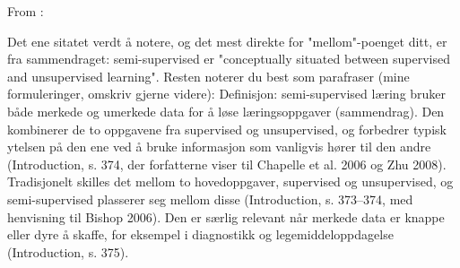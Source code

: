From \parencite{engelen2020semi_supervised} :

Det ene sitatet verdt å notere, og det mest direkte for "mellom"-poenget ditt, er fra sammendraget: semi-supervised er "conceptually situated between supervised and unsupervised learning".
Resten noterer du best som parafraser (mine formuleringer, omskriv gjerne videre):
Definisjon: semi-supervised læring bruker både merkede og umerkede data for å løse læringsoppgaver (sammendrag).
Den kombinerer de to oppgavene fra supervised og unsupervised, og forbedrer typisk ytelsen på den ene ved å bruke informasjon som vanligvis hører til den andre (Introduction, s. 374, der forfatterne viser til Chapelle et al. 2006 og Zhu 2008).
Tradisjonelt skilles det mellom to hovedoppgaver, supervised og unsupervised, og semi-supervised plasserer seg mellom disse (Introduction, s. 373–374, med henvisning til Bishop 2006).
Den er særlig relevant når merkede data er knappe eller dyre å skaffe, for eksempel i diagnostikk og legemiddeloppdagelse (Introduction, s. 375).

